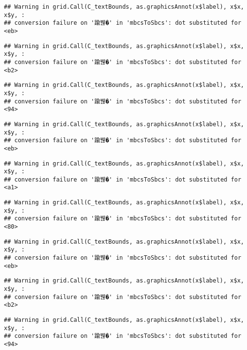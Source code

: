 \documentclass[
]{article}
\begin{document}
\begin{verbatim}
## Warning in grid.Call(C_textBounds, as.graphicsAnnot(x$label), x$x, x$y, :
## conversion failure on '踰붾�' in 'mbcsToSbcs': dot substituted for <eb>
\end{verbatim}

\begin{verbatim}
## Warning in grid.Call(C_textBounds, as.graphicsAnnot(x$label), x$x, x$y, :
## conversion failure on '踰붾�' in 'mbcsToSbcs': dot substituted for <b2>
\end{verbatim}

\begin{verbatim}
## Warning in grid.Call(C_textBounds, as.graphicsAnnot(x$label), x$x, x$y, :
## conversion failure on '踰붾�' in 'mbcsToSbcs': dot substituted for <94>
\end{verbatim}

\begin{verbatim}
## Warning in grid.Call(C_textBounds, as.graphicsAnnot(x$label), x$x, x$y, :
## conversion failure on '踰붾�' in 'mbcsToSbcs': dot substituted for <eb>
\end{verbatim}

\begin{verbatim}
## Warning in grid.Call(C_textBounds, as.graphicsAnnot(x$label), x$x, x$y, :
## conversion failure on '踰붾�' in 'mbcsToSbcs': dot substituted for <a1>
\end{verbatim}

\begin{verbatim}
## Warning in grid.Call(C_textBounds, as.graphicsAnnot(x$label), x$x, x$y, :
## conversion failure on '踰붾�' in 'mbcsToSbcs': dot substituted for <80>
\end{verbatim}

\begin{verbatim}
## Warning in grid.Call(C_textBounds, as.graphicsAnnot(x$label), x$x, x$y, :
## conversion failure on '踰붾�' in 'mbcsToSbcs': dot substituted for <eb>
\end{verbatim}

\begin{verbatim}
## Warning in grid.Call(C_textBounds, as.graphicsAnnot(x$label), x$x, x$y, :
## conversion failure on '踰붾�' in 'mbcsToSbcs': dot substituted for <b2>
\end{verbatim}

\begin{verbatim}
## Warning in grid.Call(C_textBounds, as.graphicsAnnot(x$label), x$x, x$y, :
## conversion failure on '踰붾�' in 'mbcsToSbcs': dot substituted for <94>
\end{verbatim}
\end{document}
